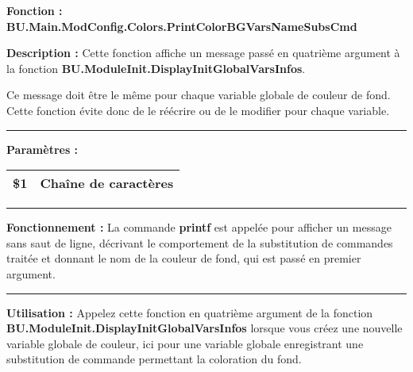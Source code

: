 \documentclass[a4paper,10pt]{article}
\begin{document}
\begin{justify}
    \textbf{Fonction : \color{func}BU.Main.ModConfig.Colors.PrintColorBGVarsNameSubsCmd}
\end{justify}

\begin{justify}
    \textbf{Description :} Cette fonction affiche un message passé en quatrième argument à la fonction \textbf{\color{func}BU.ModuleInit.DisplayInitGlobalVarsInfos}.
\end{justify}

\begin{justify}
    Ce message doit être le même pour chaque variable globale de couleur de fond. Cette fonction évite donc de le réécrire ou de le modifier pour chaque variable.
\end{justify}


\par\noindent\rule{\textwidth}{0.4pt}

\begin{justify}
    \textbf{Paramètres :}

    \begin{tabular}{|l|l|}
        \hline
        \textbf{\color{vars}\$1} & Chaîne de caractères\\
        \hline
    \end{tabular}
\end{justify}


\par\noindent\rule{\textwidth}{0.4pt}

\begin{justify}
    \textbf{Fonctionnement :} La commande \textbf{\color{cmds}printf} est appelée pour afficher un message sans saut de ligne, décrivant le comportement de la substitution de commandes traitée et donnant le nom de la couleur de fond, qui est passé en premier argument.
\end{justify}


\par\noindent\rule{\textwidth}{0.4pt}

\begin{justify}
    \textbf{Utilisation :} Appelez cette fonction en quatrième argument de la fonction \textbf{\color{func}BU.ModuleInit.DisplayInitGlobalVarsInfos} lorsque vous créez une nouvelle variable globale de couleur, ici pour une variable globale enregistrant une substitution de commande permettant la coloration du fond.
\end{justify}
\end{document}
